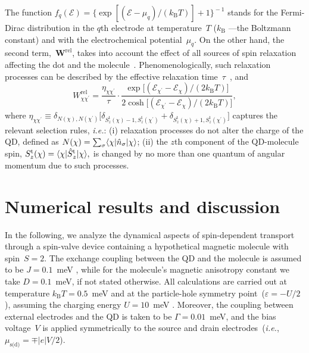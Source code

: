 \documentclass[doublecol]{epl2} %
\newcommand{\bra}[1]{\langle #1|}
\newcommand{\ket}[1]{|#1\rangle}
\newcommand{\e}{\varepsilon}
\newcommand{\En}{\mathcal{E}}
\newcommand{\s}{\sigma}
\newcommand{\G}{\Gamma}
\newcommand{\opSt}{\skew{3}{\hat}{S}^\text{t}}
\newcommand{\Szt}{S_z^\text{t}}
\newcommand{\opn}{\skew{1}{\hat}{n}}
\newcommand{\matW}{\bm{W}}
\newcommand{\ie}{\emph{i.e.}\xspace}
\begin{document}
%
The function
%
\mbox{$
	f_q(\En)
	\!
	=
	\!
	\big\{
	\!
	\exp[(\En-\mu_q)/(k_\text{B}T)]
	\!
	+
	\!
	1
	\big\}^{\!-1}
$}
stands for the Fermi-Dirac distribution in the $q$th electrode at temperature~$T$ ($k_\text{B}$ ---the Boltzmann constant) and with the electrochemical potential~$\mu_q$.
%
On the other hand, the second term,~$\matW^\text{rel}$, takes into account the effect of all sources of spin relaxation affecting the dot and the molecule~\cite{Gatteschi_book}. Phenomenologically, such relaxation processes can be described by the effective relaxation time~$\tau$~\cite{Weymann2006May,Misiorny2008May}, and 
%
\begin{equation}
	W_{\chi\chi^\prime}^\text{rel}
	=
	\frac{\eta_{\chi\chi^\prime}}{\tau}
	\cdot
	\frac{\exp\big[(\En_{\chi^\prime}-\En_\chi)/(2k_\text{B}T)\big]
	}{
	2\cosh\big[(\En_{\chi^\prime}-\En_\chi)/(2k_\text{B}T)\big]
	}
	,
\end{equation}
%
where
%
\mbox{$
	\eta_{\chi\chi^\prime}
	\equiv
	\delta_{N(\chi),N(\chi^\prime)}
	\big[
	\delta_{S_z^\text{t}(\chi)-1,S_z^\text{t}(\chi^\prime)}
	+
	\delta_{S_z^\text{t}(\chi)+1,S_z^\text{t}(\chi^\prime)}
	\big]
$}
%
captures the relevant selection rules, \ie:
%
(i) relaxation processes do not alter the charge of the QD, defined as
%
$
	N(\chi)
	=
	\sum_\s
	\bra{\chi}
	\opn_\s
	\ket{\chi}
$;
%
(ii) the $z$th component of the QD-molecule spin,
%
$
	\Szt(\chi)
	=
	\bra{\chi}
	\opSt_z
	\ket{\chi}
	,
$
%
is changed by no more than one quantum of angular momentum due to such processes.


\section{Numerical results and discussion}
%
In the following, we analyze the dynamical aspects of spin-dependent transport through a spin-valve device containing a hypothetical magnetic molecule with spin~\mbox{$S=2$}. The exchange coupling between the QD
and the molecule is assumed to be $J = 0.1$~meV \cite{Urdampilleta2011Jul},
while for the molecule's magnetic anisotropy constant we 
take $D = 0.1$~meV, if not stated otherwise.
%
All calculations are carried out at temperature \mbox{$k_\text{B}T=0.5$}~meV
and at the particle-hole symmetry point~(\mbox{$\e=-U/2$}),
assuming the charging energy \mbox{$U=10$}~meV \cite{Candini2011Jun}.
%
Moreover, the coupling between external electrodes and the QD is taken to be \mbox{$\G=0.01$}~meV, and the bias voltage~$V$ is applied symmetrically to the source and drain electrodes~(\ie, \mbox{$\mu_\text{s(d)}=\mp |e|V/2$}).
\end{document}
